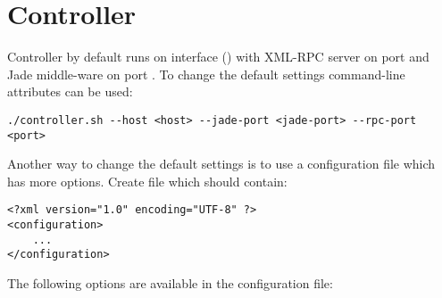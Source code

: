 \section{Controller}
Controller by default runs on  interface () with XML-RPC server on port  and Jade middle-ware on port . To change the default settings command-line attributes can be used:
\begin{verbatim}
./controller.sh --host <host> --jade-port <jade-port> --rpc-port <port>
\end{verbatim}
Another way to change the default settings is to use a configuration file which has more options. Create file  which should contain:
\begin{verbatim}
<?xml version="1.0" encoding="UTF-8" ?>
<configuration>
    ...
</configuration>
\end{verbatim}
The following options are available in the configuration file:
